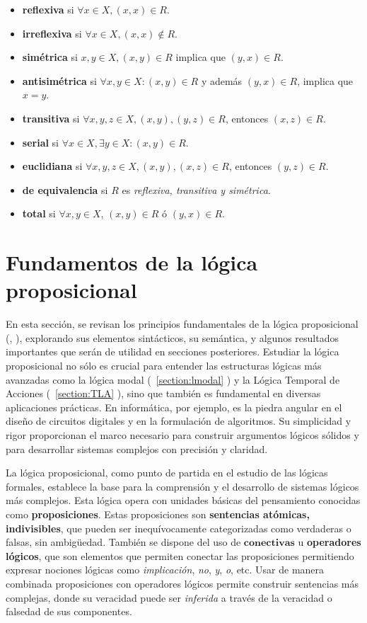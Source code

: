 \begin{itemize}
    \item \textbf{reflexiva} si $\forall x \in X, (x,x) \in R$.
    \item \textbf{irreflexiva} si $\forall x \in X, (x,x) \not \in R$.
    \item \textbf{simétrica} si $x,y \in X, (x,y) \in R$ implica que $(y,x) \in R$.
    \item \textbf{antisimétrica} si $\forall x,y \in X : (x,y) \in R$ y además $(y,x) \in R$, implica que $x = y$.
    \item \textbf{transitiva} si $\forall x,y,z \in X, (x,y),(y,z) \in R$, entonces $(x,z) \in R$.
    \item \textbf{serial} si $\forall x \in X, \exists y \in X : (x,y) \in R$.
    \item \textbf{euclidiana} si $\forall x,y,z \in X, (x,y),(x,z) \in R$, entonces $(y,z) \in R$.
    \item \textbf{de equivalencia} si $R$ es \textit{reflexiva, transitiva y simétrica}.
    \item \textbf{total} si $\forall x,y \in X$, $(x,y) \in R$ ó $(y,x) \in R$.
\end{itemize}

\section{Fundamentos de la lógica proposicional}\label{section:lprop}
En esta sección, se revisan los principios fundamentales de la lógica proposicional (\cite[Capítulo 8]{monk1976mathematical},\cite{garciaolmedo2018lprop} ), explorando sus elementos sintácticos, su semántica, y algunos resultados importantes que serán de utilidad en secciones posteriores. Estudiar la lógica proposicional no sólo es crucial para entender las estructuras lógicas más avanzadas como la lógica modal (~\ref{section:lmodal} ) y la Lógica Temporal de Acciones (~\ref{section:TLA} ), sino que también es fundamental en diversas aplicaciones prácticas. En informática, por ejemplo, es la piedra angular en el diseño de circuitos digitales y en la formulación de algoritmos. Su simplicidad y rigor proporcionan el marco necesario para construir argumentos lógicos sólidos y para desarrollar sistemas complejos con precisión y claridad.


La lógica proposicional, como punto de partida en el estudio de las lógicas formales, establece la base para la comprensión y el desarrollo de sistemas lógicos más complejos. Esta lógica opera con unidades básicas del pensamiento conocidas como \textbf{proposiciones}. Estas proposiciones son \textbf{sentencias atómicas, indivisibles}, que pueden ser inequívocamente categorizadas como verdaderas o falsas, sin ambigüedad. También se dispone del uso de $\textbf{conectivas}$ u \textbf{operadores lógicos}, que son elementos que permiten conectar las proposiciones permitiendo expresar nociones lógicas como \textit{implicación}, \textit{no}, \textit{y}, \textit{o}, etc. Usar de manera combinada proposiciones con operadores lógicos permite construir sentencias más complejas, donde su veracidad puede ser \textit{inferida} a través de la veracidad o falsedad de sus componentes.



